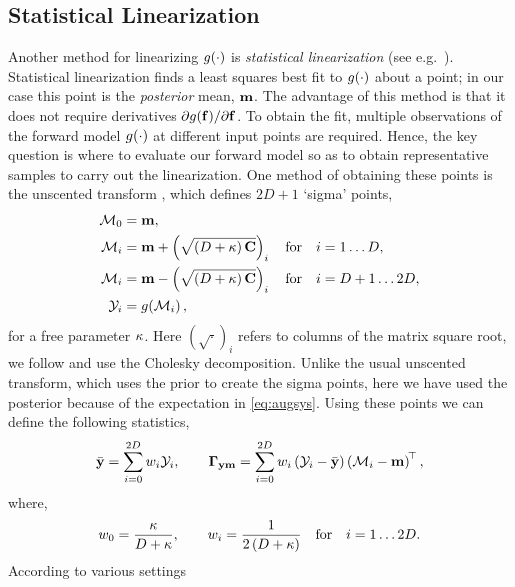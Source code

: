\documentclass{article} %
\begin{document}
\subsection{Statistical Linearization}

Another method for linearizing $g\!\left({{\cdot}}\right)$ is \emph{statistical
    linearization} (see e.g.~\cite{Geist2010}). Statistical linearization finds
a least squares best fit to $g\!\left({{\cdot}}\right)$ about a point; in our case this
point is the \emph{posterior} mean, $\mathbf{m}$. The advantage of this method is
that it does not require derivatives
$\partial g\!\left({{\mathbf{f}}}\right)\!/\partial\mathbf{f}$.  To obtain the fit, multiple
observations of the forward model  $g\!\left({{\cdot}}\right)$ at  different input points
are required. Hence, the key question is where to evaluate our forward model so
as to obtain representative samples to carry out the linearization. 
%
One method of obtaining these points is the unscented transform
\cite{Julier2004}, which defines $2D+1$ `sigma' points,
\begin{align}
    \mathcal{M}_0 &= \mathbf{m},
        \label{eq:spoint0} \\
    \mathcal{M}_i &= \mathbf{m} + \left({\sqrt{\left({D + \kappa}\right) \mathbf{C}}}\right)_i \quad
        \text{for} \quad i = 1 \ldots D, \\
    \mathcal{M}_i &= \mathbf{m} - \left({\sqrt{\left({D + \kappa}\right) \mathbf{C}}}\right)_i \quad
        \text{for} \quad i = D+1 \ldots 2D,
        \label{eq:spointi} \\
    \mathcal{Y}_i &= g\!\left({{\mathcal{M}_i}}\right) \text{,}
\end{align}
for a free parameter $\kappa$. 
Here $(\sqrt{\cdot})_i$ refers to columns of the matrix square root, we follow
\cite{Julier2004} and use the Cholesky decomposition. Unlike the usual
unscented transform, which uses the prior to create the sigma points, here we
have used the posterior because of the expectation in \eqref{eq:augsys}. Using
these points we can define the following statistics,
\begin{equation}
    \bar{\mathbf{y}} = \sum^{2D}_{i=0} w_i \mathcal{Y}_i,
    \qquad
    \boldsymbol\Gamma_{\mathbf{y}\mathbf{m}} = \sum^{2D}_{i=0} w_i \left({\mathcal{Y}_i - \bar{\mathbf{y}}}\right)
        \left({\mathcal{M}_i - \mathbf{m}}\right)^{\!\top},
    \label{eq:slstats}
\end{equation}
where,
\begin{equation}
    w_0 = \frac{\kappa}{D + \kappa},
        \qquad w_i = \frac{1}{2\left({D + \kappa}\right)}
        \quad \text{for} \quad i = 1 \ldots 2D \text{.}
    \label{eq:slweights}
\end{equation}
According to \cite{Julier2004} various settings
\end{document}
